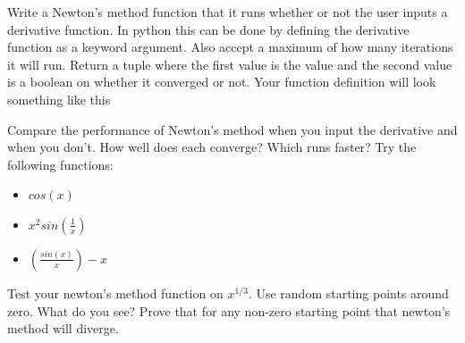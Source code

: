 \begin{problem}
Write a Newton's method function that it runs whether or not the user inputs a derivative function. In python this can be done by defining the derivative function as a keyword argument. Also accept a maximum of how many iterations it will run. Return a tuple where the first value is the value and the second value is a boolean on whether it converged or not. Your function definition will look something like this 

Compare the performance of Newton's method when you input the derivative and when you don't. How well does each converge? Which runs faster? Try the following functions:

\begin{itemize}
\item $cos(x)$
\item $x^2sin(\frac{1}{x})$
\item $(\frac{sin(x)}{x})-x$
\end{itemize}
\end{problem}

\begin{problem}
Test your newton's method function on $x^{1/3}$. Use random starting points around zero. What do you see? Prove that for any non-zero starting point that newton's method will diverge.
\end{problem}

